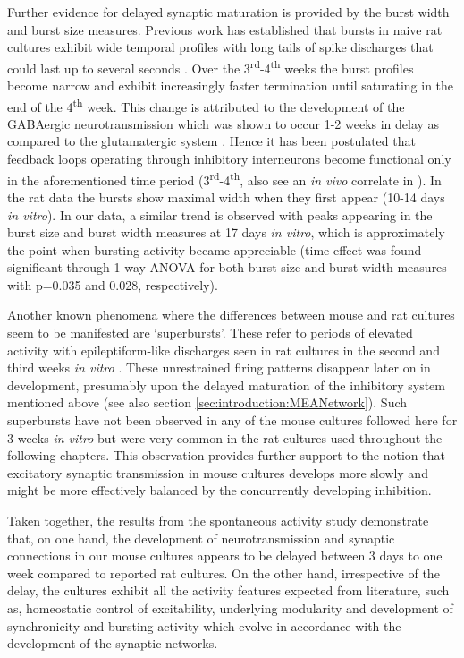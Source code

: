         Further evidence for delayed synaptic maturation is provided by the burst width and burst size measures. Previous work has established that bursts in naive rat cultures exhibit wide temporal profiles with long tails of spike discharges that could last up to several seconds \cite{chiappalone2006dissociated,van2004longterm}. Over the 3\textsuperscript{rd}-4\textsuperscript{th} weeks the burst profiles become narrow and exhibit increasingly faster termination until saturating in the end of the 4\textsuperscript{th} week. This change is attributed to the development of the GABAergic neurotransmission which was shown to occur 1-2 weeks in delay as compared to the glutamatergic system \cite{ramakers1994activity,swanwick2006development}. Hence it has been postulated that feedback loops operating through inhibitory interneurons become functional only in the aforementioned time period  \cite{van2004long} (3\textsuperscript{rd}-4\textsuperscript{th}, also see an \textit{in vivo} correlate in \cite{hensch2005critical}). In the rat data the bursts show maximal width when they first appear (10-14 days \textit{in vitro}). In our data, a similar trend is observed with peaks appearing in the burst size and burst width measures at 17 days \textit{in vitro}, which is approximately the point when bursting activity became appreciable (time effect was found significant through 1-way ANOVA for both burst size and burst width measures with p=0.035 and 0.028, respectively).

        Another known phenomena where the differences between mouse and rat cultures seem to be manifested are `superbursts'. These refer to periods of elevated activity with epileptiform-like discharges seen in rat cultures in the second and third weeks \textit{in vitro} \cite{wagenaar2006extremely}. These unrestrained firing patterns disappear later on in development, presumably upon the delayed maturation of the inhibitory system mentioned above (see also section \ref{sec:introduction:MEANetwork}). Such superbursts have not been observed in any of the mouse cultures followed here for 3 weeks \textit{in vitro} but were very common in the rat cultures used throughout the following chapters. This observation provides further support to the notion that excitatory synaptic transmission in mouse cultures develops more slowly and might be more effectively balanced by the concurrently developing inhibition.

        Taken together, the results from the spontaneous activity study demonstrate that, on one hand, the development of neurotransmission and synaptic connections in our mouse cultures appears to be delayed between 3 days to one week compared to reported rat cultures. On the other hand, irrespective of the delay, the cultures exhibit all the activity features expected from literature, such as, homeostatic control of excitability, underlying modularity and development of synchronicity and bursting activity which evolve in accordance with the development of the synaptic networks.


